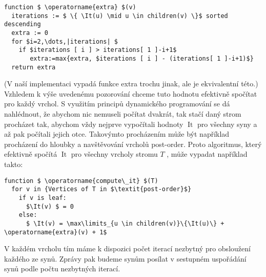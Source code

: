 \documentclass[12pt,a4paper]{article}
\theoremstyle{plain}
\newcommand{\It}{\operatorname{It}}
\begin{document}
\begin{lstlisting}[mathescape]
function $ \operatorname{extra} $(v)
  iterations := $ \{ \It(u) \mid u \in children(v) \}$ sorted descending 
  extra := 0
  for $i=2,\dots,|iterations| $
    if $iterations [ i ] > iterations[ 1 ]-i+1$
       extra:=max{extra, $iterations [ i ] - (iterations[ 1 ]-i+1)$}
  return extra
\end{lstlisting}

(V naší implementaci vypadá funkce extra trochu jinak, ale je ekvivalentní této.)\\

Vzhledem k výše uvedenému pozorování chceme tuto hodnotu efektivně spočítat pro každý vrchol. S využitím principů dynamického programování se dá nahlédnout, že abychom nic nemuseli počítat dvakrát, tak stačí daný strom procházet tak, abychom vždy nejprve vypočítali hodnoty $ \It $ pro všechny syny a až pak počítali jejich otce. Takovýmto procházením může být například procházení do hloubky a navštěvování vrcholů post-order. Proto algoritmus, který efektivně spočítá $ \It $ pro všechny vrcholy stromu $ T $ , může vypadat například takto:

\begin{lstlisting}[mathescape]
function $ \operatorname{compute\_it} $(T)
  for v in {Vertices of T in $\textit{post-order}$}
    if v is leaf:
      $\It(v) $ = 0
    else:
      $ \It(v) = \max\limits_{u \in children(v)}\{\It(u)\} + \operatorname{extra}(v) + 1$
\end{lstlisting}

V každém vrcholu tím máme k dispozici počet iterací nezbytný pro obsloužení každého ze synů. Zprávy pak budeme synům posílat v sestupném uspořádání synů podle počtu nezbytných iterací.\\
\end{document}

